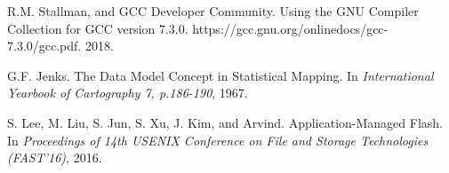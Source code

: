 \begin{thebibliography}{00}
R.M. Stallman, and GCC Developer Community.
Using the GNU Compiler Collection for GCC version 7.3.0.
https://gcc.gnu.org/onlinedocs/gcc-7.3.0/gcc.pdf. 2018.

G.F. Jenks.
The Data Model Concept in Statistical Mapping.
In \textit{International Yearbook of Cartography 7, p.186-190}, 1967.

S. Lee, M. Liu, S. Jun, S. Xu, J. Kim, and Arvind.
Application-Managed Flash.
In \textit{Proceedings of 14th USENIX Conference on File and Storage
Technologies (FAST'16)}, 2016.

\end{thebibliography}
